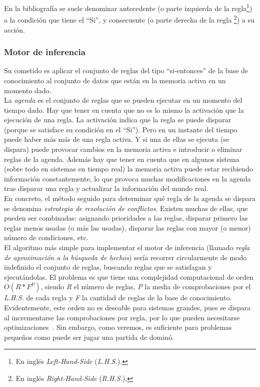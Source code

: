 En la bibliografía se suele denominar antecedente (o parte izquierda
de la regla\footnote{En inglés \emph{Left-Hand-Side}
  (\emph{L.H.S.}).}) a la condición que tiene el ``Si'', y
consecuente (o parte derecha de la regla \footnote{En inglés
  \emph{Right-Hand-Side} (\emph{R.H.S.}).}) a su acción. \\


\subsubsection{Motor de inferencia}

Su cometido es aplicar el conjunto de reglas del tipo ``si-entonces''
de la base de conocimiento al conjunto de datos que están en la
memoria activa en un momento dado. \\

La \emph{agenda} es el conjunto de reglas que se pueden ejecutar en un
momento del tiempo dado. Hay que tener en cuenta que no es lo mismo la
activación que la ejecución de una regla. La activación indica que la
regla se puede disparar (porque se satisface su condición en el
``Si''). Pero en un instante del tiempo puede haber más más de una
regla activa. Y si una de ellas se ejecuta (se dispara) puede provocar
cambios en la memoria activa e introducir o eliminar reglas de la
agenda. Además hay que tener en cuenta que en algunos sistema (sobre
todo en sistemas en tiempo real) la memoria activa puede estar
recibiendo información constantemente, lo que provoca muchas
modificaciones en la agenda tras disparar una regla y actualizar la información del mundo real. \\

En concreto, el método seguido para determinar qué regla de la agenda
se dispara se denomina \emph{estrategia de resolución de
  conflictos}. Existen muchas de ellas, que pueden ser combinadas:
asignando prioridades a las reglas, disparar primero las reglas menos
usadas (o más las usadas), disparar las reglas con mayor (o menor)
número de condiciones, etc. \\

El algoritmo más simple para implementar el motor de inferencia
(llamado \emph{regla de aproximación a la búsqueda de hechos}) sería
recorrer circularmente de modo indefinido el conjunto de reglas,
buscando reglas que se satisfagan y ejecutándolas. El problema es que
tiene una complejidad computacional de orden $O(R*F^P)$, siendo
\emph{R} el número de reglas, \emph{P} la media de comprobaciones por
el \emph{L.H.S.} de cada regla y \emph{F} la cantidad de reglas de la
base de conocimiento. Evidentemente, este orden no es deseable para
sistemas grandes, pues se dispara al incrementarse las comprobaciones
por regla, por lo que pueden necesitarse optimizaciones~\cite{springerlink:10.1007/1155698575}. Sin embargo, como veremos, es suficiente para problemas
pequeños como puede ser jugar una partida de dominó.



